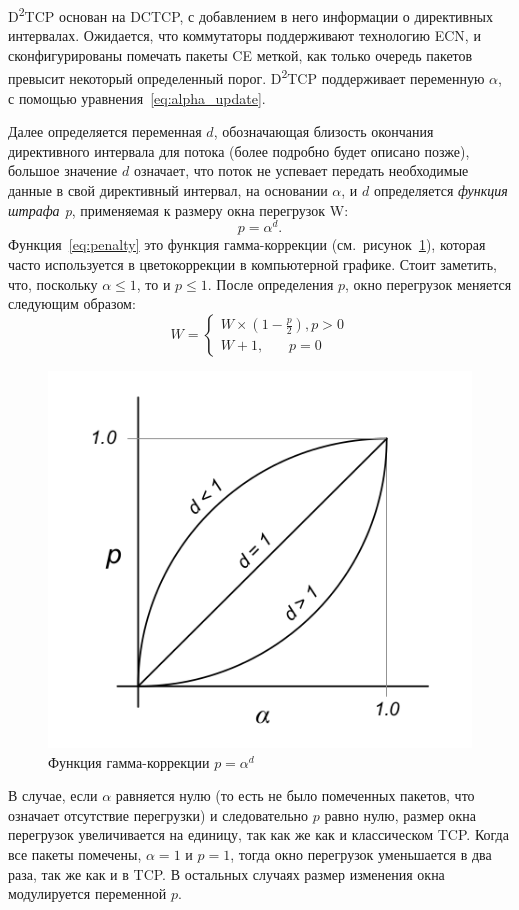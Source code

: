 \documentclass[14pt, a4paper,oneside]{extarticle}
\begin{document}
D\textsuperscript{2}TCP основан на DCTCP, с добавлением в него информации о директивных интервалах. Ожидается, что коммутаторы поддерживают технологию ECN, и сконфигурированы помечать пакеты CE меткой, как только очередь пакетов превысит некоторый определенный порог. D\textsuperscript{2}TCP поддерживает переменную $\alpha$, с помощью уравнения~\eqref{eq:alpha_update}.

Далее определяется переменная $d$, обозначающая близость окончания директивного интервала для потока (более подробно будет описано позже), большое значение $d$ означает, что поток не успевает передать необходимые данные в свой директивный интервал, на основании $\alpha$, и $d$ определяется \emph{функция штрафа p}, применяемая к размеру окна перегрузок W:
\begin{equation}\label{eq:penalty}
p = \alpha^{d}.
\end{equation}
Функция~\eqref{eq:penalty} это функция гамма-коррекции (см.~рисунок~\ref{gamma}), которая часто используется в цветокоррекции в компьютерной графике. Стоит заметить, что, поскольку $\alpha \leq 1$, то и $p \leq 1$. После определения $p$, окно перегрузок меняется следующим образом:
\begin{equation}\label{eq:window_resize}
W = \begin{cases}
W\times(1 - \frac{p}{2}), p > 0\\
W + 1,~~~~~~~~ p = 0
\end{cases}
\end{equation}
\begin{figure}
	\includegraphics[width=0.6\linewidth]{gamma}
	\caption{Функция гамма-коррекции $p = \alpha^d$}
	\label{gamma}
\end{figure}
В случае, если $\alpha$ равняется нулю (то есть не было помеченных пакетов, что означает отсутствие перегрузки) и следовательно $p$ равно нулю, размер окна перегрузок увеличивается на единицу, так как же как и классическом TCP. Когда все пакеты помечены, $\alpha = 1$ и $p = 1$, тогда окно перегрузок уменьшается в два раза, так же как и в TCP. В остальных случаях размер изменения окна модулируется переменной $p$.
\end{document}
